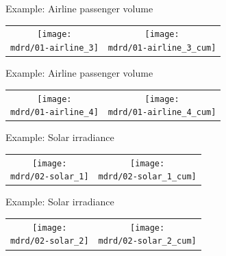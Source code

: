 \begin{frame}{Example: Airline passenger volume}
\newcommand{\wmgd}{0.5\columnwidth}
\newcommand{\hmgd}{3.0cm}
\newcommand{\mdrd}{../figures/01-airline}
\newcommand{\mbm}{\hspace{-0.3cm}}
{\footnotesize

}

\vspace{\baselineskip}

\begin{tabular}{cc}
\mbm \texttt{[image: \\mdrd/01-airline\_3]} & \texttt{[image: \\mdrd/01-airline\_3\_cum]}
\end{tabular}
\end{frame}

\begin{frame}{Example: Airline passenger volume}
\newcommand{\wmgd}{0.5\columnwidth}
\newcommand{\hmgd}{3.0cm}
\newcommand{\mdrd}{../figures/01-airline}
\newcommand{\mbm}{\hspace{-0.3cm}}
{\footnotesize

}

\vspace{\baselineskip}

\begin{tabular}{cc}
\mbm \texttt{[image: \\mdrd/01-airline\_4]} & \texttt{[image: \\mdrd/01-airline\_4\_cum]}
\end{tabular}
\end{frame}

\begin{frame}{Example: Solar irradiance}
\newcommand{\wmgd}{0.5\columnwidth}
\newcommand{\hmgd}{3.0cm}
\newcommand{\mdrd}{../figures/02-solar}
\newcommand{\mbm}{\hspace{-0.3cm}}
{\footnotesize

}

\vspace{\baselineskip}

\begin{tabular}{cc}
\mbm \texttt{[image: \\mdrd/02-solar\_1]} & \texttt{[image: \\mdrd/02-solar\_1\_cum]}
\end{tabular}
\end{frame}

\begin{frame}{Example: Solar irradiance}
\newcommand{\wmgd}{0.5\columnwidth}
\newcommand{\hmgd}{3.0cm}
\newcommand{\mdrd}{../figures/02-solar}
\newcommand{\mbm}{\hspace{-0.3cm}}
{\footnotesize

}

\vspace{\baselineskip}

\begin{tabular}{cc}
\mbm \texttt{[image: \\mdrd/02-solar\_2]} & \texttt{[image: \\mdrd/02-solar\_2\_cum]}
\end{tabular}
\end{frame}

